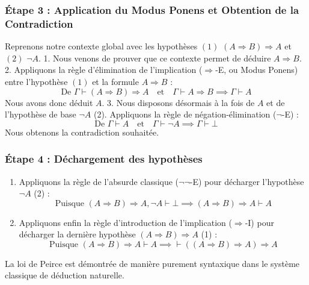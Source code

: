 \documentclass[11pt,a4paper]{article}
\begin{document}
\hypertarget{uxe9tape-3-application-du-modus-ponens-et-obtention-de-la-contradiction}{%
\subsubsection{Étape 3 : Application du Modus Ponens et Obtention de la
Contradiction}\label{uxe9tape-3-application-du-modus-ponens-et-obtention-de-la-contradiction}}

Reprenons notre contexte global avec les hypothèses \((1)\)
\((A \Rightarrow B) \Rightarrow A\) et \((2)\) \(\neg A\). 1. Nous
venons de prouver que ce contexte permet de déduire \(A \Rightarrow B\).
2. Appliquons la règle d'élimination de l'implication
(\(\Rightarrow\)-E, ou Modus Ponens) entre l'hypothèse \((1)\) et la
formule \(A \Rightarrow B\) :
\[\text{De } \Gamma \vdash (A \Rightarrow B) \Rightarrow A \quad \text{et} \quad \Gamma \vdash A \Rightarrow B \implies \Gamma \vdash A\]
Nous avons donc déduit \(A\). 3. Nous disposons désormais à la fois de
\(A\) et de l'hypothèse de base \(\neg A\) (2). Appliquons la règle de
négation-élimination (\(\neg\)-E) :
\[\text{De } \Gamma \vdash A \quad \text{et} \quad \Gamma \vdash \neg A \implies \Gamma \vdash \bot\]
Nous obtenons la contradiction souhaitée.

\hypertarget{uxe9tape-4-duxe9chargement-des-hypothuxe8ses}{%
\subsubsection{Étape 4 : Déchargement des
hypothèses}\label{uxe9tape-4-duxe9chargement-des-hypothuxe8ses}}

\begin{enumerate}
\def\labelenumi{\arabic{enumi}.}
\tightlist
\item
  Appliquons la règle de l'absurde classique (\(\neg\neg\)-E) pour
  décharger l'hypothèse \(\neg A\) (2) :
  \[\text{Puisque } (A \Rightarrow B) \Rightarrow A, \neg A \vdash \bot \implies (A \Rightarrow B) \Rightarrow A \vdash A\]
\item
  Appliquons enfin la règle d'introduction de l'implication
  (\(\Rightarrow\)-I) pour décharger la dernière hypothèse
  \((A \Rightarrow B) \Rightarrow A\) (1) :
  \[\text{Puisque } (A \Rightarrow B) \Rightarrow A \vdash A \implies \vdash ((A \Rightarrow B) \Rightarrow A) \Rightarrow A\]
\end{enumerate}

La loi de Peirce est démontrée de manière purement syntaxique dans le
système classique de déduction naturelle.
\end{document}
